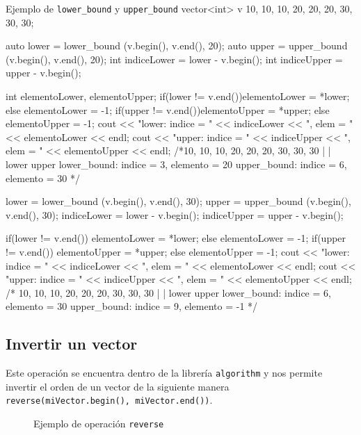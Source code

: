 \documentclass{article}
\begin{document}
    \begin{codelisting}{Ejemplo de \texttt{lower\_bound} y \texttt{upper\_bound} }
vector<int> v {10, 10, 10, 20, 20, 20, 30, 30, 30};

auto lower = lower_bound (v.begin(), v.end(), 20);
auto upper = upper_bound (v.begin(), v.end(), 20);
int indiceLower = lower - v.begin();
int indiceUpper = upper - v.begin();

int elementoLower, elementoUpper;
if(lower != v.end())elementoLower = *lower;
else elementoLower = -1;    
if(upper != v.end())elementoUpper = *upper;
else elementoUpper = -1;    
cout << "lower: indice = " << indiceLower << ", elem = " << elementoLower << endl; 
cout << "upper: indice = " << indiceUpper << ", elem = " << elementoUpper << endl; 
/*10, 10, 10, 20, 20, 20, 30, 30, 30
               |           |
             lower       upper
    lower_bound: indice = 3, elemento = 20
    upper_bound: indice = 6, elemento = 30    */

lower = lower_bound (v.begin(), v.end(), 30);
upper = upper_bound (v.begin(), v.end(), 30);
indiceLower = lower - v.begin();
indiceUpper = upper - v.begin();

if(lower != v.end()) elementoLower = *lower;
else elementoLower = -1;    
if(upper != v.end()) elementoUpper = *upper;
else elementoUpper = -1;    
cout << "lower: indice = " << indiceLower << ", elem = " << elementoLower << endl; 
cout << "upper: indice = " << indiceUpper << ", elem = " << elementoUpper << endl; 
/*  10, 10, 10, 20, 20, 20, 30, 30, 30
                            |          |
                            lower      upper
    lower_bound: indice = 6, elemento = 30
    upper_bound: indice = 9, elemento = -1    */      
    \end{codelisting}
    \subsection{Invertir un vector}
    Este operación se encuentra dentro de la librería \texttt{algorithm} y nos permite invertir el orden de un vector
    de la siguiente manera \texttt{reverse(miVector.begin(), miVector.end())}.

    \begin{figure}[h]
        \centering
        \caption{Ejemplo de operación \texttt{reverse}}
    \end{figure}
\end{document}

